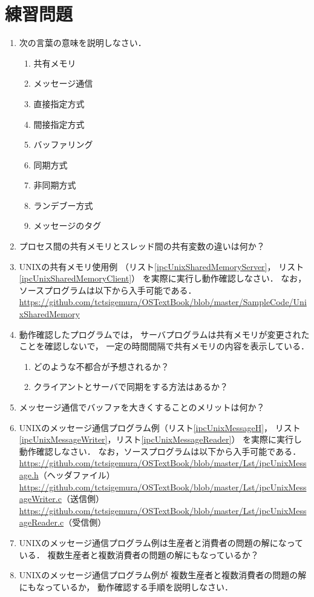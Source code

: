 \section*{練習問題}
\begin{enumerate}
  \renewcommand{\labelenumi}{\ttfamily\arabic{chapter}.\arabic{enumi}}
  \setlength{\leftskip}{1em}
\item 次の言葉の意味を説明しなさい．
  \begin{enumerate}
  \item 共有メモリ
  \item メッセージ通信
  \item 直接指定方式
  \item 間接指定方式
  \item バッファリング
  \item 同期方式
  \item 非同期方式
  \item ランデブー方式
  \item メッセージのタグ
  \end{enumerate}
\item プロセス間の共有メモリとスレッド間の共有変数の違いは何か？
\item UNIXの共有メモリ使用例
  （リスト\ref{ipcUnixSharedMemoryServer}，
    リスト\ref{ipcUnixSharedMemoryClient}）
  を実際に実行し動作確認しなさい．
  なお，ソースプログラムは以下から入手可能である． \\
  \url{https://github.com/tctsigemura/OSTextBook/blob/master/SampleCode/UnixSharedMemory}
\item 動作確認したプログラムでは，
  サーバプログラムは共有メモリが変更されたことを確認しないで，
  一定の時間間隔で共有メモリの内容を表示している．
  \begin{enumerate}
  \item どのような不都合が予想されるか？
  \item クライアントとサーバで同期をする方法はあるか？
  \end{enumerate}
\item メッセージ通信でバッファを大きくすることのメリットは何か？
\item UNIXのメッセージ通信プログラム例（リスト\ref{ipcUnixMessageH}，
  リスト\ref{ipcUnixMessageWriter}，リスト\ref{ipcUnixMessageReader}）
  を実際に実行し動作確認しなさい．
  なお，ソースプログラムは以下から入手可能である． \\
  \url{https://github.com/tctsigemura/OSTextBook/blob/master/Lst/ipcUnixMessage.h}（ヘッダファイル）\\
  \url{https://github.com/tctsigemura/OSTextBook/blob/master/Lst/ipcUnixMessageWriter.c}（送信側）\\
  \url{https://github.com/tctsigemura/OSTextBook/blob/master/Lst/ipcUnixMessageReader.c}（受信側）
\item UNIXのメッセージ通信プログラム例は生産者と消費者の問題の解になっている．
  複数生産者と複数消費者の問題の解にもなっているか？
\item UNIXのメッセージ通信プログラム例が
  複数生産者と複数消費者の問題の解にもなっているか，
  動作確認する手順を説明しなさい．
\end{enumerate}
